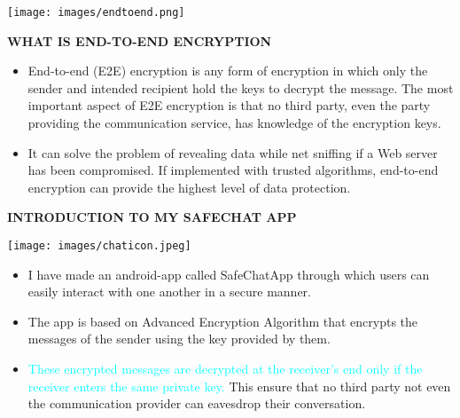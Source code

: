 \documentclass{beamer}
\begin{document}
\begin{frame}[plain]
\begin{center}
\texttt{[image: images/endtoend.png]}
\end{center}
\end{frame}



\begin{frame}
\begin{tcolorbox}
\begin{center}
\textsc{\textbf{\textcolor{byzantium}{WHAT IS END-TO-END ENCRYPTION}}}
\end{center}
\end{tcolorbox}
\begin{flushleft}
\begin{itemize}
\item End-to-end (E2E) encryption is any form of encryption in which only the sender and intended recipient hold the keys to decrypt the message. The most important aspect of E2E encryption is that no third party, even the party providing the communication service, has knowledge of the encryption keys.
\item It can solve the problem of revealing data while net sniffing if a Web server has been compromised. If implemented with trusted algorithms, end-to-end encryption can provide the highest level of data protection.
\end{itemize}
\end{flushleft}
\end{frame}



\begin{frame}
\begin{tcolorbox}
\begin{center}
\textsc{\textbf{\textcolor{byzantium}{INTRODUCTION TO MY SAFECHAT APP}}}
\end{center}
\end{tcolorbox}
\begin{center}
\texttt{[image: images/chaticon.jpeg]}
\end{center}
\begin{flushleft}
\begin{itemize}
\item I have made an android-app called SafeChatApp through which users can easily interact with one another in a secure manner.
\item The app is based on Advanced Encryption Algorithm that encrypts the messages of the sender using the key provided by them. 
\item \textcolor{cyan}{These encrypted messages are decrypted at the receiver’s end only if the receiver enters the same private key.} This ensure that no third party not even the communication provider can eavesdrop their conversation.
\end{itemize}
\end{flushleft}
\end{frame}
\end{document}
